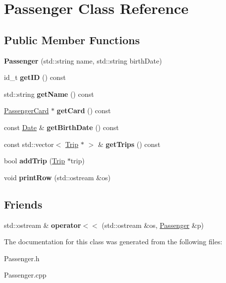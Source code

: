 \hypertarget{classPassenger}{}\section{Passenger Class Reference}
\label{classPassenger}
\subsection*{Public Member Functions}
\begin{DoxyCompactItemize}
\item 
\mbox{\label{classPassenger_a895d7a9cfd358b566ed78e0d81d37bff}} 
{\bfseries Passenger} (std\+::string name, std\+::string birth\+Date)
\item 
\mbox{\label{classPassenger_ae6fcc19037be144f654c623c5b78ae24}} 
id\+\_\+t {\bfseries get\+ID} () const
\item 
\mbox{\label{classPassenger_a7c919f6947817ff1c6a4ee51923c116f}} 
std\+::string {\bfseries get\+Name} () const
\item 
\mbox{\label{classPassenger_ae8d5310db80438702dec5f4d649289f1}} 
\mbox{\hyperlink{classPassengerCard}{Passenger\+Card}} $\ast$ {\bfseries get\+Card} () const
\item 
\mbox{\label{classPassenger_aa2101584d2f0daf83ef58e0491754395}} 
const \mbox{\hyperlink{classDate}{Date}} \& {\bfseries get\+Birth\+Date} () const
\item 
\mbox{\label{classPassenger_a06dfa54524d4ca1a85b1599b278fb871}} 
const std\+::vector$<$ \mbox{\hyperlink{classTrip}{Trip}} $\ast$ $>$ \& {\bfseries get\+Trips} () const
\item 
\mbox{\label{classPassenger_a2fef29e013c88ba7a75d259cebfa655d}} 
bool {\bfseries add\+Trip} (\mbox{\hyperlink{classTrip}{Trip}} $\ast$trip)
\item 
\mbox{\label{classPassenger_a72e4042544557a3dd9c02198aa2582d8}} 
void {\bfseries print\+Row} (std\+::ostream \&os)
\end{DoxyCompactItemize}
\subsection*{Friends}
\begin{DoxyCompactItemize}
\item 
\mbox{\label{classPassenger_a7b1aeaded08562578690b788f39db888}} 
std\+::ostream \& {\bfseries operator$<$$<$} (std\+::ostream \&os, \mbox{\hyperlink{classPassenger}{Passenger}} \&p)
\end{DoxyCompactItemize}


The documentation for this class was generated from the following files\+:\begin{DoxyCompactItemize}
\item 
Passenger.\+h\item 
Passenger.\+cpp\end{DoxyCompactItemize}
